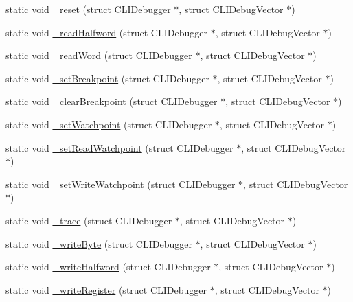 \begin{DoxyCompactItemize}
\item 
static void \mbox{\hyperlink{debugger_2cli-debugger_8c_ab05ea35fc2d35b4a05bad6c08c1d8336}{\+\_\+reset}} (struct C\+L\+I\+Debugger $\ast$, struct C\+L\+I\+Debug\+Vector $\ast$)
\item 
static void \mbox{\hyperlink{debugger_2cli-debugger_8c_af10209f39f98d7d0cc72b9d00a556c7a}{\+\_\+read\+Halfword}} (struct C\+L\+I\+Debugger $\ast$, struct C\+L\+I\+Debug\+Vector $\ast$)
\item 
static void \mbox{\hyperlink{debugger_2cli-debugger_8c_abb342e8169f294b6f362d32712732c68}{\+\_\+read\+Word}} (struct C\+L\+I\+Debugger $\ast$, struct C\+L\+I\+Debug\+Vector $\ast$)
\item 
static void \mbox{\hyperlink{debugger_2cli-debugger_8c_a0a52c3456f6b68ef9b560a42b816794c}{\+\_\+set\+Breakpoint}} (struct C\+L\+I\+Debugger $\ast$, struct C\+L\+I\+Debug\+Vector $\ast$)
\item 
static void \mbox{\hyperlink{debugger_2cli-debugger_8c_add7707dc6faa04d636e11df0566a18f3}{\+\_\+clear\+Breakpoint}} (struct C\+L\+I\+Debugger $\ast$, struct C\+L\+I\+Debug\+Vector $\ast$)
\item 
static void \mbox{\hyperlink{debugger_2cli-debugger_8c_a17749710370e117b89191f855280b6a1}{\+\_\+set\+Watchpoint}} (struct C\+L\+I\+Debugger $\ast$, struct C\+L\+I\+Debug\+Vector $\ast$)
\item 
static void \mbox{\hyperlink{debugger_2cli-debugger_8c_a0f7e98d855bf3ce2a7114f3f24336dfb}{\+\_\+set\+Read\+Watchpoint}} (struct C\+L\+I\+Debugger $\ast$, struct C\+L\+I\+Debug\+Vector $\ast$)
\item 
static void \mbox{\hyperlink{debugger_2cli-debugger_8c_af6aec1b47f652b1a4dd4f98d9e1dacc1}{\+\_\+set\+Write\+Watchpoint}} (struct C\+L\+I\+Debugger $\ast$, struct C\+L\+I\+Debug\+Vector $\ast$)
\item 
static void \mbox{\hyperlink{debugger_2cli-debugger_8c_a80cf5fb5ee6e64803683a6b205b36d57}{\+\_\+trace}} (struct C\+L\+I\+Debugger $\ast$, struct C\+L\+I\+Debug\+Vector $\ast$)
\item 
static void \mbox{\hyperlink{debugger_2cli-debugger_8c_ac5ac1c482e79eff2eab004ce9383e849}{\+\_\+write\+Byte}} (struct C\+L\+I\+Debugger $\ast$, struct C\+L\+I\+Debug\+Vector $\ast$)
\item 
static void \mbox{\hyperlink{debugger_2cli-debugger_8c_a96e516203d239d2cb3ca1dfc1651fba0}{\+\_\+write\+Halfword}} (struct C\+L\+I\+Debugger $\ast$, struct C\+L\+I\+Debug\+Vector $\ast$)
\item 
static void \mbox{\hyperlink{debugger_2cli-debugger_8c_aea6200b640b85462b66907e252c9b7cd}{\+\_\+write\+Register}} (struct C\+L\+I\+Debugger $\ast$, struct C\+L\+I\+Debug\+Vector $\ast$)

\end{DoxyCompactItemize}
